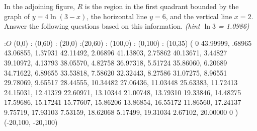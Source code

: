 
%
%
%
%
% 
% 


\question In the adjoining figure, $R$ is the region in the first quadrant bounded by the graph of  $y =4\ln (3-x)$, the horizontal line $y=6$, and the vertical line $x=2$. Answer the following questions based on this information. \textit{(hint $\ln 3$ = 1.0986)}

\begin{marginfigure}
:$O$ (0,0)
: (0,60)
: (20,0)
:(20,60)
: (100,0)
: (0,100)
: (10,35)
\figdrawbegin{}
\figdrawlineC(
0 43.99999,
.68965 43.06855,
1.37931 42.11492,
2.06896 41.13803,
2.75862 40.13671,
3.44827 39.10972,
4.13793 38.05570,
4.82758 36.97318,
5.51724 35.86060,
6.20689 34.71622,
6.89655 33.53818,
7.58620 32.32443,
8.27586 31.07275,
8.96551 29.78069,
9.65517 28.44555,
10.34482 27.06436,
11.03448 25.63383,
11.72413 24.15031,
12.41379 22.60971,
13.10344 21.00748,
13.79310 19.33846,
14.48275 17.59686,
15.17241 15.77607,
15.86206 13.86854,
16.55172 11.86560,
17.24137 9.75719,
17.93103 7.53159,
18.62068 5.17499,
19.31034 2.67102,
20.00000 0
)
\figdrawline [2,4]
\figdrawline [3,4]
(-20,100, -20,100)
\figdrawend
\centerline{\box\figBoxA}
\end{marginfigure}


